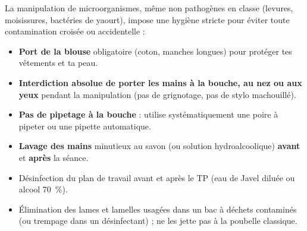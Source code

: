 \documentclass[11pt]{article}
\begin{document}
\begin{attention}
La manipulation de microorganismes, même non pathogènes en classe (levures, moisissures, bactéries de yaourt), impose une hygiène stricte pour éviter toute contamination croisée ou accidentelle :
\begin{itemize}
    \item \textbf{Port de la blouse} obligatoire (coton, manches longues) pour protéger tes vêtements et ta peau.
    \item \textbf{Interdiction absolue de porter les mains à la bouche, au nez ou aux yeux} pendant la manipulation (pas de grignotage, pas de stylo machouillé).
    \item \textbf{Pas de pipetage à la bouche} : utilise systématiquement une poire à pipeter ou une pipette automatique.
    \item \textbf{Lavage des mains} minutieux au savon (ou solution hydroalcoolique) \textbf{avant} et \textbf{après} la séance.
    \item Désinfection du plan de travail avant et après le TP (eau de Javel diluée ou alcool \SI{70}{\%}).
    \item Élimination des lames et lamelles usagées dans un bac à déchets contaminés (ou trempage dans un désinfectant) ; ne les jette pas à la poubelle classique.
\end{itemize}
\end{attention}
\end{document}
